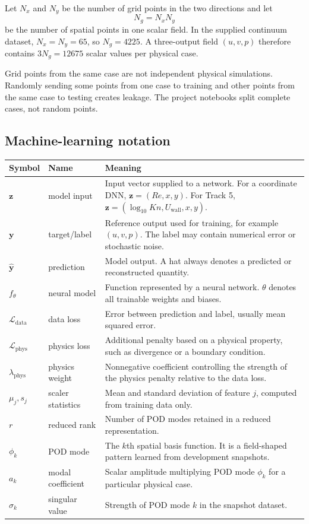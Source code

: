 \documentclass[11pt]{article}
\begin{document}
Let $N_x$ and $N_y$ be the number of grid points in the two directions and let
\[
N_g=N_xN_y
\]
be the number of spatial points in one scalar field. In the supplied continuum dataset, $N_x=N_y=65$, so $N_g=4225$. A three-output field $(u,v,p)$ therefore contains $3N_g=12675$ scalar values per physical case.

\begin{warningbox}
Grid points from the same case are not independent physical simulations. Randomly sending some points from one case to training and other points from the same case to testing creates leakage. The project notebooks split complete cases, not random points.
\end{warningbox}

\subsection{Machine-learning notation}
\begin{tabularx}{\textwidth}{@{}p{}p{}Y@{}}
\toprule
\textbf{Symbol} & \textbf{Name} & \textbf{Meaning}\\
\midrule
$\mathbf z$ & model input & Input vector supplied to a network. For a coordinate DNN, $\mathbf z=(Re,x,y)$. For Track 5, $\mathbf z=(\log_{10}Kn,U_{\mathrm{wall}},x,y)$.\\
$\mathbf y$ & target/label & Reference output used for training, for example $(u,v,p)$. The label may contain numerical error or stochastic noise.\\
$\widehat{\mathbf y}$ & prediction & Model output. A hat always denotes a predicted or reconstructed quantity.\\
$f_{\theta}$ & neural model & Function represented by a neural network. $\theta$ denotes all trainable weights and biases.\\
$\mathcal L_{\mathrm{data}}$ & data loss & Error between prediction and label, usually mean squared error.\\
$\mathcal L_{\mathrm{phys}}$ & physics loss & Additional penalty based on a physical property, such as divergence or a boundary condition.\\
$\lambda_{\mathrm{phys}}$ & physics weight & Nonnegative coefficient controlling the strength of the physics penalty relative to the data loss.\\
$\mu_j,s_j$ & scaler statistics & Mean and standard deviation of feature $j$, computed from training data only.\\
$r$ & reduced rank & Number of POD modes retained in a reduced representation.\\
$\phi_k$ & POD mode & The $k$th spatial basis function. It is a field-shaped pattern learned from development snapshots.\\
$a_k$ & modal coefficient & Scalar amplitude multiplying POD mode $\phi_k$ for a particular physical case.\\
$\sigma_k$ & singular value & Strength of POD mode $k$ in the snapshot dataset.\\
\bottomrule
\end{tabularx}
\end{document}
